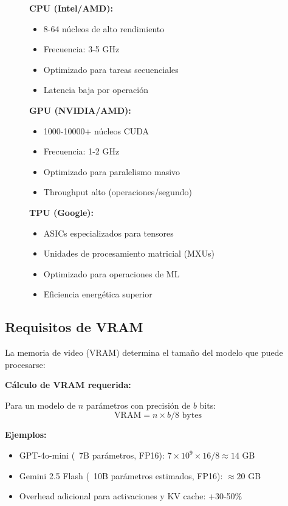 \documentclass[12pt,a4paper]{article}
\begin{document}
\begin{figure}[H]
\centering
\begin{tcolorbox}[colback=green!5!white,colframe=green!75!black,title=Comparación CPU vs GPU]
\textbf{CPU (Intel/AMD):}
\begin{itemize}
    \item 8-64 núcleos de alto rendimiento
    \item Frecuencia: 3-5 GHz
    \item Optimizado para tareas secuenciales
    \item Latencia baja por operación
\end{itemize}

\textbf{GPU (NVIDIA/AMD):}
\begin{itemize}
    \item 1000-10000+ núcleos CUDA
    \item Frecuencia: 1-2 GHz
    \item Optimizado para paralelismo masivo
    \item Throughput alto (operaciones/segundo)
\end{itemize}

\textbf{TPU (Google):}
\begin{itemize}
    \item ASICs especializados para tensores
    \item Unidades de procesamiento matricial (MXUs)
    \item Optimizado para operaciones de ML
    \item Eficiencia energética superior
\end{itemize}
\end{tcolorbox}
\end{figure}

\subsection{Requisitos de VRAM}

La memoria de video (VRAM) determina el tamaño del modelo que puede procesarse:

\textbf{Cálculo de VRAM requerida:}

Para un modelo de $n$ parámetros con precisión de $b$ bits:
\[
\text{VRAM} = n \times b / 8 \text{ bytes}
\]

\textbf{Ejemplos:}
\begin{itemize}
    \item GPT-4o-mini (~7B parámetros, FP16): $7 \times 10^9 \times 16 / 8 \approx 14$ GB
    \item Gemini 2.5 Flash (~10B parámetros estimados, FP16): $\approx 20$ GB
    \item Overhead adicional para activaciones y KV cache: +30-50\%
\end{itemize}
\end{document}
